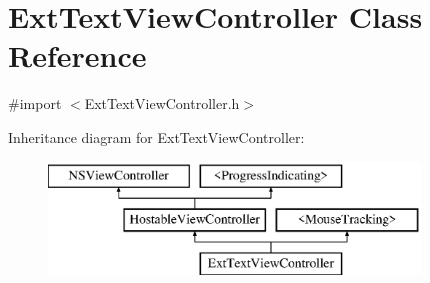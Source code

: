\hypertarget{interface_ext_text_view_controller}{\section{Ext\-Text\-View\-Controller Class Reference}
\label{interface_ext_text_view_controller}
}


{\ttfamily \#import $<$Ext\-Text\-View\-Controller.\-h$>$}

Inheritance diagram for Ext\-Text\-View\-Controller\-:\begin{figure}[H]
\begin{center}
\leavevmode
\includegraphics[height=3.000000cm]{interface_ext_text_view_controller}
\end{center}
\end{figure}
